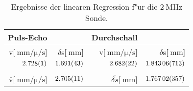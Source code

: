\begin{table}[!h]
\begin{center}
\begin{tabular}{|r|r|r|r|}
\hline
Puls-Echo & & Durchschall & \\
\hline
\hline
v[$\SI{}{\milli\meter\per\micro\per\second}$] & $\delta$s[$\SI{}{\milli\meter}$] & v[$\SI{}{\milli\meter\per\micro\per\second}$]& $\delta$s[$\SI{}{\milli\meter}$]\\
\hline
$\SI{2.728 (1)}{}$ & $\SI{1.691 (43)}{}$ & $\SI{2.682 (22)}{}$ & $\SI{1.84306 (713)}{}$\\
\hline
\hline
\\
$\bar{\mathrm{v}}$[$\SI{}{\milli\meter\per\micro\per\second}$] & $\SI{2.705 (11)}{}$ & $\bar{\delta s}$[$\SI{}{\milli\meter}$] & $\SI{1.76702 (357)}{}$\\
\hline
\end{tabular}
\caption[]{Ergebnisse der linearen Regression f"ur die $\SI{2}{\mega\hertz}$ Sonde.}
\label{r2}
\end{center}
\end{table}